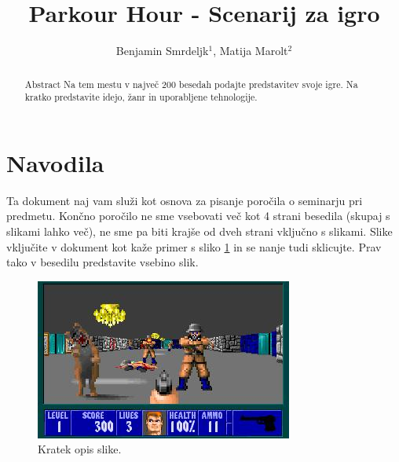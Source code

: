 \documentclass[a4paper]{article}
\begin{document}
\title{Parkour Hour - Scenarij za igro}

\author{Benjamin Smrdeljk$^{1}$, Matija Marolt$^{2}$} %



\maketitle


\begin{abstract}{Abstract}
Na tem mestu v največ 200 besedah podajte predstavitev svoje igre. Na kratko predstavite idejo, žanr in {upo\-ra\-blje\-ne} tehnologije.
\end{abstract}

\section*{Navodila}
Ta dokument naj vam služi kot osnova za pisanje poročila o seminarju pri predmetu. Končno poročilo ne sme vsebovati več kot 4 strani besedila (skupaj s slikami lahko več), ne sme pa biti krajše od dveh strani vključno s slikami. Slike vključite v dokument kot kaže primer s sliko \ref{fig:slika} in se nanje tudi sklicujte. Prav tako v besedilu predstavite vsebino slik.

\begin{figure}[!htb]
    \begin{center}
        \includegraphics[width=\columnwidth]{wolfenstein.jpg}
        \caption{Kratek opis slike.} \label{fig:slika}
    \end{center}
\end{figure}
\end{document}
